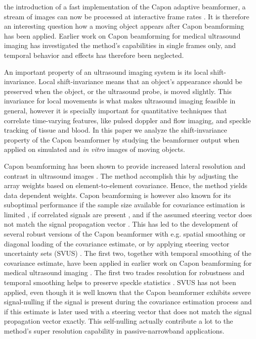 \documentclass[journal]{IEEEtran}
\begin{document}
 the introduction of a fast implementation of the Capon adaptive beamformer, a stream of images can now be processed at interactive frame rates \cite{Asen}. It is therefore an interesting question how a moving object appears after Capon beamforming has been applied. Earlier work on Capon beamforming for medical ultrasound imaging has investigated the method's capabilities in single frames only, and temporal behavior and effects has therefore been neglected. 

An important property of an ultrasound imaging system is its local shift-invariance. Local shift-invariance means that an object’s appearance should be preserved when the object, or the ultrasound probe, is moved slightly. This invariance for local movements is what makes ultrasound imaging feasible in general, however it is specially important for quantitative techniques that correlate time-varying features, like pulsed doppler and flow imaging, and speckle tracking of tissue and blood. In this paper we analyze the shift-invariance property of the Capon beamformer by studying the beamformer output when applied on simulated and \textit{in vitro} images of moving objects. 

Capon beamforming has been shown to provide increased lateral resolution and contrast in ultrasound images \cite{Synnevag2007, Synnevag2009, Chen2011}. The method accomplish this by adjusting the array weights based on element-to-element covariance. Hence, the method yields data dependent weights. Capon beamforming is however also known for its suboptimal performance if the sample size available for covariance estimation is limited \cite{Mestre2006}, if correlated signals are present \cite{Widrow1982}, and if the assumed steering vector does not match the signal propagation vector \cite{Wax1996, Wax1996a}. This has led to the development of several robust versions of the Capon beamformer with e.g. spatial smoothing \cite{Shan1985} or diagonal loading \cite{JianLi2003} of the covariance estimate, or by applying steering vector uncertainty sets (SVUS) \cite{Lorenz2005, Rubsamen2013}. The first two, together with temporal smoothing of the covariance estimate, have been applied in earlier work on Capon beamforming for medical ultrasound imaging \cite{Synnevag2009}. The first two trades resolution for robustness and temporal smoothing helps to preserve speckle statistics \cite{Synnevag2007a}. SVUS has not been applied, even though it is well known that the Capon beamformer exhibits severe signal-nulling if the signal is present during the covariance estimation process and if this estimate is later used with a steering vector that does not match the signal propagation vector exactly. This self-nulling actually contribute a lot to the method's super resolution capability in passive-narrowband applications. 
\end{document}
